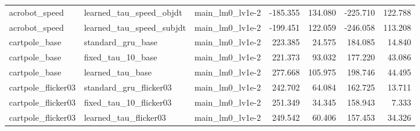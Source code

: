 \begin{tabular}{lllrrrr}
acrobot_speed & learned_tau_speed_objdt & main_lm0_lv1e-2 & -185.355 & 134.080 & -225.710 & 122.788 \\
acrobot_speed & learned_tau_speed_subjdt & main_lm0_lv1e-2 & -199.451 & 122.059 & -246.058 & 113.208 \\
cartpole_base & standard_gru_base & main_lm0_lv1e-2 & 223.385 & 24.575 & 184.085 & 14.840 \\
cartpole_base & fixed_tau_10_base & main_lm0_lv1e-2 & 221.373 & 93.032 & 177.220 & 43.086 \\
cartpole_base & learned_tau_base & main_lm0_lv1e-2 & 277.668 & 105.975 & 198.746 & 44.495 \\
cartpole_flicker03 & standard_gru_flicker03 & main_lm0_lv1e-2 & 242.702 & 64.084 & 162.725 & 13.711 \\
cartpole_flicker03 & fixed_tau_10_flicker03 & main_lm0_lv1e-2 & 251.349 & 34.345 & 158.943 & 7.333 \\
cartpole_flicker03 & learned_tau_flicker03 & main_lm0_lv1e-2 & 249.542 & 60.406 & 157.453 & 34.326 \\
\bottomrule
\end{tabular}
